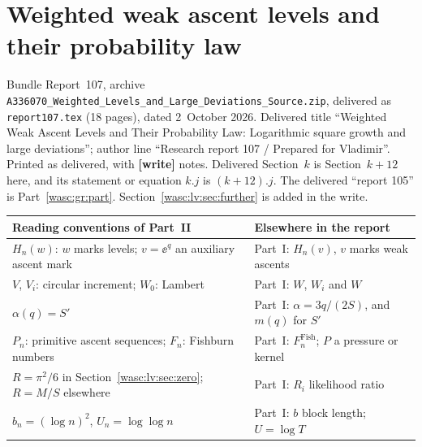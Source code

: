 \documentclass[11pt,a4paper]{article}
\newcommand{\file}[1]{\nolinkurl{#1}}
\theoremstyle{remark}\newtheorem{remark}[theorem]{Remark}
\numberwithin{equation}{section}
\newcommand{\partsource}[1]{\par\noindent\begin{minipage}{\textwidth}\small #1\end{minipage}\par\medskip}
\begin{document}
\part{Weighted weak ascent levels and their probability law}\label{wasc:lv:part}
\partsource{Bundle Report~107, archive \file{A336070_Weighted_Levels_and_Large_Deviations_Source.zip}, delivered as \file{report107.tex} (18 pages), dated 2~October 2026. Delivered title ``Weighted Weak Ascent Levels and Their Probability Law: Logarithmic square growth and large deviations''; author line ``Research report 107 / Prepared for Vladimir''. Printed as delivered, with \textbf{[write]} notes. Delivered Section~$k$ is Section~$k+12$ here, and its statement or equation $k.j$ is $(k+12).j$. The delivered ``report 105'' is Part~\ref{wasc:gr:part}. Section~\ref{wasc:lv:sec:further} is added in the write.}
\begin{center}
\small
\begin{tabular}{@{}>{\raggedright\arraybackslash}p{} >{\raggedright\arraybackslash}p{}@{}}
\toprule
Reading conventions of Part~II & Elsewhere in the report\\
\midrule
$H_n(w)$: $w$ marks levels; $v=\ee^q$ an auxiliary ascent mark & Part~I: $H_n(v)$, $v$ marks weak ascents\\
$V$, $V_i$: circular increment; $W_0$: Lambert & Part~I: $W$, $W_i$ and $W$\\
$\alpha(q)=S'$ & Part~I: $\alpha=3q/(2S)$, and $m(q)$ for $S'$\\
$P_n$: primitive ascent sequences; $F_n$: Fishburn numbers & Part~I: $F^{\mathrm{Fish}}_n$; $P$ a pressure or kernel\\
$R=\pi^2/6$ in Section~\ref{wasc:lv:sec:zero}; $R=M/S$ elsewhere & Part~I: $R_i$ likelihood ratio\\
$b_n=(\log n)^2$, $U_n=\log\log n$ & Part~I: $b$ block length; $U=\log T$\\
\bottomrule
\end{tabular}
\end{center}
\end{document}
